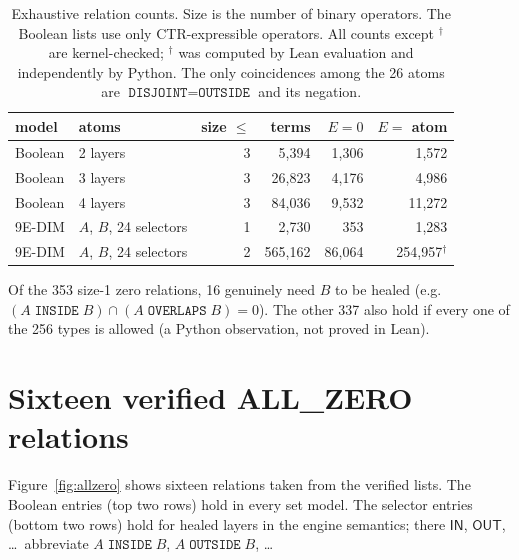 \documentclass[11pt]{article}
\newcommand{\op}[1]{\texttt{#1}}
\newcommand{\sel}[1]{\ensuremath{\mathsf{#1}}}
\begin{document}
\begin{table}[h]
\centering\small
\begin{tabular}{llrrrr}
\toprule
model & atoms & size $\le$ & terms & $E=0$ & $E=$ atom\\
\midrule
Boolean & 2 layers & 3 & 5{,}394 & 1{,}306 & 1{,}572\\
Boolean & 3 layers & 3 & 26{,}823 & 4{,}176 & 4{,}986\\
Boolean & 4 layers & 3 & 84{,}036 & 9{,}532 & 11{,}272\\
9E-DIM & $A$, $B$, 24 selectors & 1 & 2{,}730 & 353 & 1{,}283\\
9E-DIM & $A$, $B$, 24 selectors & 2 & 565{,}162 & 86{,}064 & 254{,}957$^\dagger$\\
\bottomrule
\end{tabular}
\caption{Exhaustive relation counts. Size is the number of binary operators. The Boolean lists use only CTR-expressible operators. All counts except $^\dagger$ are kernel-checked; $^\dagger$ was computed by Lean evaluation and independently by Python. The only coincidences among the 26 atoms are $\op{DISJOINT}=\op{OUTSIDE}$ and its negation.}
\label{tab:counts}
\end{table}

Of the 353 size-1 zero relations, 16 genuinely need $B$ to be healed (e.g.\ $(A\;\op{INSIDE}\;B)\cap(A\;\op{OVERLAPS}\;B)=0$). The other 337 also hold if every one of the 256 types is allowed (a Python observation, not proved in Lean).

\section{Sixteen verified ALL\_ZERO relations}
Figure~\ref{fig:allzero} shows sixteen relations taken from the verified lists. The Boolean entries (top two rows) hold in every set model. The selector entries (bottom two rows) hold for healed layers in the engine semantics; there \sel{IN}, \sel{OUT}, \dots\ abbreviate $A\;\op{INSIDE}\;B$, $A\;\op{OUTSIDE}\;B$, \dots
\end{document}
